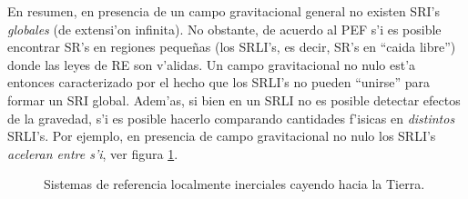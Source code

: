 En resumen, en presencia de un campo gravitacional general no existen SRI's \emph{globales} (de extensi'on infinita). No obstante, de acuerdo al PEF s'i es posible encontrar SR's en regiones peque\~nas (los SRLI's, es decir, SR's en ``caida libre'') donde las leyes de RE son v'alidas. Un campo gravitacional no nulo est'a entonces caracterizado por el hecho que los SRLI's no pueden ``unirse'' para formar un SRI global. Adem'as, si bien en un SRLI no es posible detectar efectos de la gravedad, s'i es posible hacerlo comparando cantidades f'isicas en \textit{distintos} SRLI's. Por ejemplo, en presencia de campo gravitacional no nulo los SRLI's \textit{aceleran entre s'i}, ver figura \ref{fig:SRLI}.
\begin{figure}[H]
\centering{}
\caption{Sistemas de referencia localmente inerciales cayendo hacia la Tierra.}
\label{fig:SRLI}
\end{figure}

